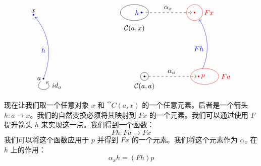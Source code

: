 \documentclass[DaoFP]{subfiles}
\begin{document}
\[
\begin{tikzpicture}
\def\ax{0}
\def\ay{0.5}
\def\xx{-0.5}
\def\xy{3.7}
\filldraw[black] (\ax, \ay) circle (1 pt);
\node (a) at (\ax, \ay) {};
\node[left] at (\ax, \ay) {$a$};
\filldraw[blue] (\xx, \xy) circle (1 pt);
\node[above] at (\xx, \xy) {$x$};

\draw [->] (a) edge[out=225, in=315, loop] (a);
\node[right] at (\ax + 0.3, \ay - 0.35) {$id_a$};

\draw[blue] (\ax, \ay) edge[->, "$h$", bend right, shorten > = 4 pt] (\xx, \xy);

\end{tikzpicture}
\hspace{80pt}
\begin{tikzpicture}

\def\ax{0}
\def\ay{0.5}
\def\xx{-0.5}
\def\xy{3.7}

\def\fax{3}
\def\fay{0.5}
\def\fxx{3 - 0.5}
\def\fxy{3.7}

\def\px{\fax - 0.3}
\def\hx{\xx + 0.35}
\draw[black] (\ax, \ay) circle (0.2);
\filldraw[black] (\ax, \ay) circle (1 pt);
\node[below] at (\ax, \ay-0.2) {$\cat C (a, a)$};
\draw[black] (\xx, \xy) ellipse (0.7 and 0.4);

\filldraw[blue] (\xx + 0.35, \xy) circle (1 pt);
\node[left, blue] at (\hx, \xy) {$h$};

\node[above] at (\xx, \xy - 1.1) {$\cat C (a, x)$};
\draw[dashed] (\hx, \xy) edge[->, "$\alpha_x$", shorten > = 4 pt] (\fxx, \fxy);

\draw[red] (\fax, \fay) ellipse (0.7 and 0.4);
\filldraw[red] (\px, \fay) circle (1 pt);
\node[right, red] at (\px, \fay) {$p$};
\node[right, red] at (\fax + 0.7, \fay) {$F a$};
\draw[dashed] (\ax, \ay) edge[->, "$\alpha_a$", shorten > = 3 pt] (\px, \fay);
\draw[red] (\fxx, \fxy) circle (0.4);
\filldraw[red] (\fxx, \fxy) circle (1 pt);
\node[right, red] at (\fxx + 0.35, \fxy) {$F x$};

\draw[blue] (\px, \fay) edge[->, "$F h$", bend right, shorten > = 12, shorten < = 12] (\fxx, \fxy);

\end{tikzpicture}
\]

现在让我们取一个任意对象 $x$ 和 $\cat C(a, x)$ 的一个任意元素。后者是一个箭头 $h \colon a \to x$。我们的自然变换必须将其映射到 $F x$ 的一个元素。我们可以通过使用 $F$ 提升箭头 $h$ 来实现这一点。我们得到一个函数：
\[F h \colon F a \to F x \]
我们可以将这个函数应用于 $p$ 并得到 $F x$ 的一个元素。我们将这个元素作为 $\alpha_x$ 在 $h$ 上的作用：
\[ \alpha_x h = (F h) p \]
\end{document}
